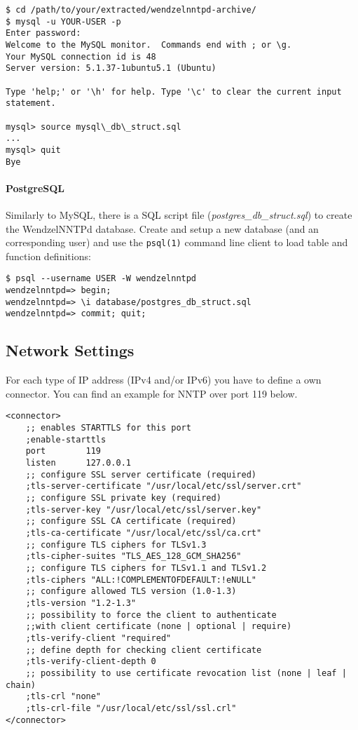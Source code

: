 \documentclass[12pt,fleqn,leqno]{scrbook}
\begin{document}
\begin{verbatim}
$ cd /path/to/your/extracted/wendzelnntpd-archive/
$ mysql -u YOUR-USER -p
Enter password:
Welcome to the MySQL monitor.  Commands end with ; or \g.
Your MySQL connection id is 48
Server version: 5.1.37-1ubuntu5.1 (Ubuntu)

Type 'help;' or '\h' for help. Type '\c' to clear the current input statement.

mysql> source mysql\_db\_struct.sql
...
mysql> quit
Bye
\end{verbatim}

\hypertarget{postgresql}{%
\paragraph{PostgreSQL}\label{postgresql}}

Similarly to MySQL, there is a SQL script file
(\emph{postgres\_db\_struct.sql}) to create the WendzelNNTPd database.
Create and setup a new database (and an corresponding user) and use the
\texttt{psql(1)} command line client to load table and function
definitions:

\begin{verbatim}
$ psql --username USER -W wendzelnntpd
wendzelnntpd=> begin;
wendzelnntpd=> \i database/postgres_db_struct.sql
wendzelnntpd=> commit; quit;
\end{verbatim}

\hypertarget{network-settings}{%
\subsection{Network Settings}\label{network-settings}}

For each type of IP address (IPv4 and/or IPv6) you have to define a own
connector. You can find an example for NNTP over port 119 below.

\begin{verbatim}
<connector>
    ;; enables STARTTLS for this port
    ;enable-starttls
    port        119
    listen      127.0.0.1
    ;; configure SSL server certificate (required)
    ;tls-server-certificate "/usr/local/etc/ssl/server.crt"
    ;; configure SSL private key (required)
    ;tls-server-key "/usr/local/etc/ssl/server.key"
    ;; configure SSL CA certificate (required)
    ;tls-ca-certificate "/usr/local/etc/ssl/ca.crt"
    ;; configure TLS ciphers for TLSv1.3
    ;tls-cipher-suites "TLS_AES_128_GCM_SHA256"
    ;; configure TLS ciphers for TLSv1.1 and TLSv1.2
    ;tls-ciphers "ALL:!COMPLEMENTOFDEFAULT:!eNULL"
    ;; configure allowed TLS version (1.0-1.3)
    ;tls-version "1.2-1.3"
    ;; possibility to force the client to authenticate 
    ;;with client certificate (none | optional | require)
    ;tls-verify-client "required"
    ;; define depth for checking client certificate
    ;tls-verify-client-depth 0
    ;; possibility to use certificate revocation list (none | leaf | chain)
    ;tls-crl "none"
    ;tls-crl-file "/usr/local/etc/ssl/ssl.crl"
</connector>
\end{verbatim}
\end{document}
